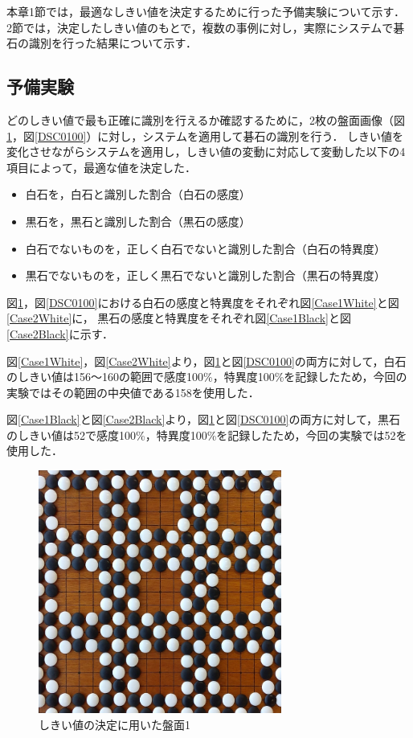 \documentclass[openright]{nitocs}
\numberwithin{equation}{section}
\begin{document}
        本章1節では，最適なしきい値を決定するために行った予備実験について示す．
        2節では，決定したしきい値のもとで，複数の事例に対し，実際にシステムで碁石の識別を行った結果について示す．

        \subsection{予備実験} \label{threshold}
            どのしきい値で最も正確に識別を行えるか確認するために，2枚の盤面画像（図\ref{DSC0087}，図\ref{DSC0100}）に対し，システムを適用して碁石の識別を行う．
            しきい値を変化させながらシステムを適用し，しきい値の変動に対応して変動した以下の4項目によって，最適な値を決定した．
            \begin{itemize}
                \item 白石を，白石と識別した割合（白石の感度）
                \item 黒石を，黒石と識別した割合（黒石の感度）
                \item 白石でないものを，正しく白石でないと識別した割合（白石の特異度）
                \item 黒石でないものを，正しく黒石でないと識別した割合（黒石の特異度）
            \end{itemize}

            図\ref{DSC0087}，図\ref{DSC0100}における白石の感度と特異度をそれぞれ図\ref{Case1White}と図\ref{Case2White}に，
            黒石の感度と特異度をそれぞれ図\ref{Case1Black}と図\ref{Case2Black}に示す．

            図\ref{Case1White}，図\ref{Case2White}より，図\ref{DSC0087}と図\ref{DSC0100}の両方に対して，白石のしきい値は156～160の範囲で感度100\%，特異度100\%を記録したため，今回の実験ではその範囲の中央値である158を使用した．

            図\ref{Case1Black}と図\ref{Case2Black}より，図\ref{DSC0087}と図\ref{DSC0100}の両方に対して，黒石のしきい値は52で感度100\%，特異度100\%を記録したため，今回の実験では52を使用した．

            \begin{figure}[tb] %
                \begin{center}
                \includegraphics[clip,width=80mm]{DSC_0087/boardImg.jpg} 
                \caption{しきい値の決定に用いた盤面1}
                \label{DSC0087}
                \end{center}
            \end{figure}
\end{document}
